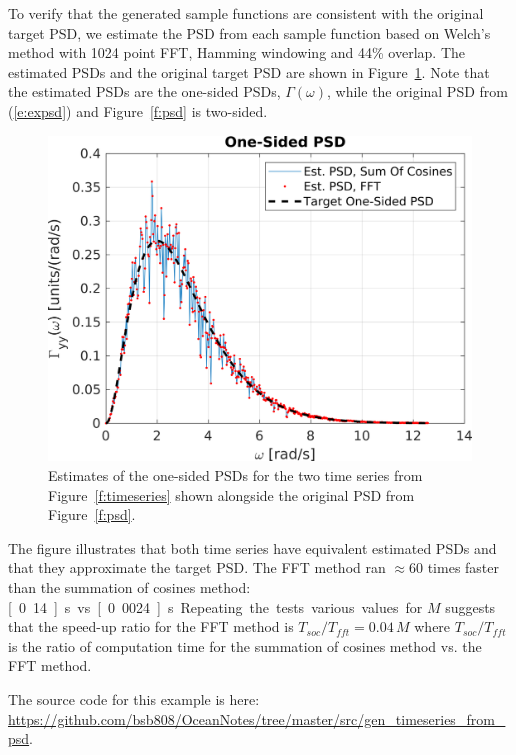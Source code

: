 \documentclass[techreport, article]{npsreport2018}
\begin{document}
To verify that the generated sample functions are consistent with the original target PSD, we estimate the PSD from each sample function based on Welch's method with 1024 point FFT, Hamming windowing and 44\% overlap.  The estimated PSDs and the original target PSD are shown in Figure~\ref{f:psdest}.  Note that the estimated PSDs are the one-sided PSDs, $\Gamma(\omega)$, while the original PSD from (\ref{e:expsd}) and Figure~\ref{f:psd} is two-sided.
\begin{figure}[hbt!]
  \centering
  \includegraphics[width=\FigWidth\textwidth]{images/psdest.png}
  \caption{Estimates of the one-sided PSDs for the two time series from Figure~\ref{f:timeseries} shown alongside the original PSD from Figure~\ref{f:psd}. }
  \label{f:psdest}
\end{figure}
The figure illustrates that both time series have equivalent estimated PSDs and that they approximate the target PSD.  The FFT method ran $\approx 60$ times faster than the summation of cosines method: \unit[0.14]{s} vs. \unit[0.0024]{s}.  Repeating the tests various values for $M$ suggests that the speed-up ratio for the FFT method is $T_{soc}/T_{fft} = 0.04 \, M$ where $T_{soc}/T_{fft}$ is the ratio of computation time for the summation of cosines method vs. the FFT method.

The source code for this example is here: \url{https://github.com/bsb808/OceanNotes/tree/master/src/gen_timeseries_from_psd}.


\end{document}
